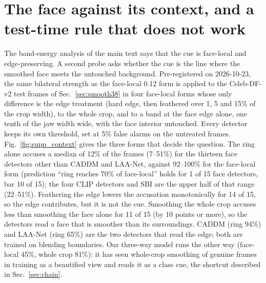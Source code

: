 \documentclass[10pt]{article}
\begin{document}
\section{The face against its context, and a test-time rule that does not work}
\label{sec:supp_context}
The band-energy analysis of the main text says that the cue is face-local and edge-preserving. A second probe asks whether the
cue is the line where the smoothed face meets the untouched background. Pre-registered on 2026-10-23, the same
bilateral strength as the face-local 0.12 form is applied to the Celeb-DF-v2 test frames of Sec.~\ref{sec:smooth38} in four
face-local forms whose only difference is the edge treatment (hard edge, then feathered over 1, 5 and 15\% of the crop width),
to the whole crop, and to a band at the face edge alone, one tenth of the jaw width wide, with the face interior untouched. Every detector keeps its own threshold, set at 5\% false alarms on the untreated frames.
Fig.~\ref{fig:supp_context} gives the three forms that decide the question. The ring alone accuses a median of 12\% of the frames
(7--51\%) for the thirteen face detectors other than CADDM and LAA-Net, against 92--100\% for the face-local form (prediction
``ring reaches 70\% of face-local'' holds for 1 of 15 face detectors, bar 10 of 15); the four CLIP detectors and SBI are the
upper half of that range (22--51\%). Feathering the edge lowers the accusation monotonically for 14 of
15, so the edge contributes, but it is not the cue. Smoothing the whole crop accuses less than smoothing the face alone for 11 of
15 (by 10 points or more), so the detectors read a face that is smoother than its surroundings. CADDM (ring 94\%) and LAA-Net
(ring 65\%) are the two detectors that read the edge; both are trained on blending boundaries. Our three-way model runs the
other way (face-local 45\%, whole crop 81\%): it has seen whole-crop smoothing of genuine frames in training as a beautified
view and reads it as a class cue, the shortcut described in Sec.~\ref{sec:chain}.
\end{document}
